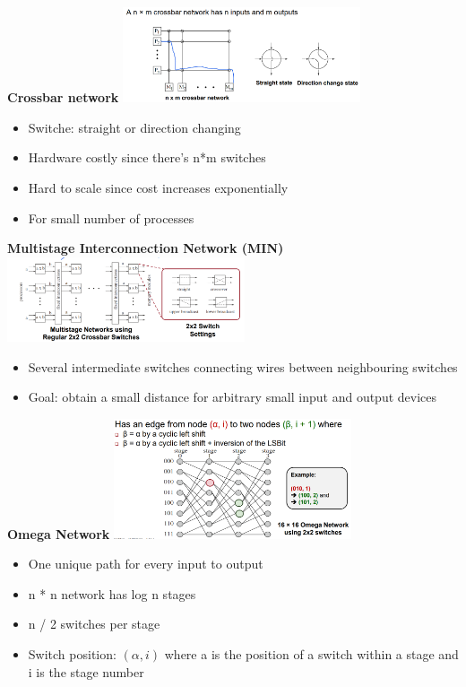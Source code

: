 \documentclass[10pt, landscape]{article}
\begin{document}
\begin{multicols}{4}
\textbf{Crossbar network}
\includegraphics*[width=7cm]{cross_bar.png}
\begin{itemize}
    \item Switche: straight or direction changing 
    \item Hardware costly since there's n*m switches
    \item Hard to scale since cost increases exponentially 
    \item For small number of processes
\end{itemize}


\textbf{Multistage Interconnection Network (MIN)}
\includegraphics*[width=7cm]{min.png}
\begin{itemize}
    \item Several intermediate switches connecting wires between neighbouring switches
    \item Goal: obtain a small distance for arbitrary small input and output devices
\end{itemize}

\textbf{Omega Network}
\includegraphics*[width=7cm]{omega_network.png}
\begin{itemize}
    \item One unique path for every input to output 
    \item n * n network has log n stages
    \item n / 2 switches per stage 
    \item Switch position: $(\alpha, i)$ where a is the position of a switch within a stage and i is the stage number 
\end{itemize}


\end{multicols}
\end{document}
